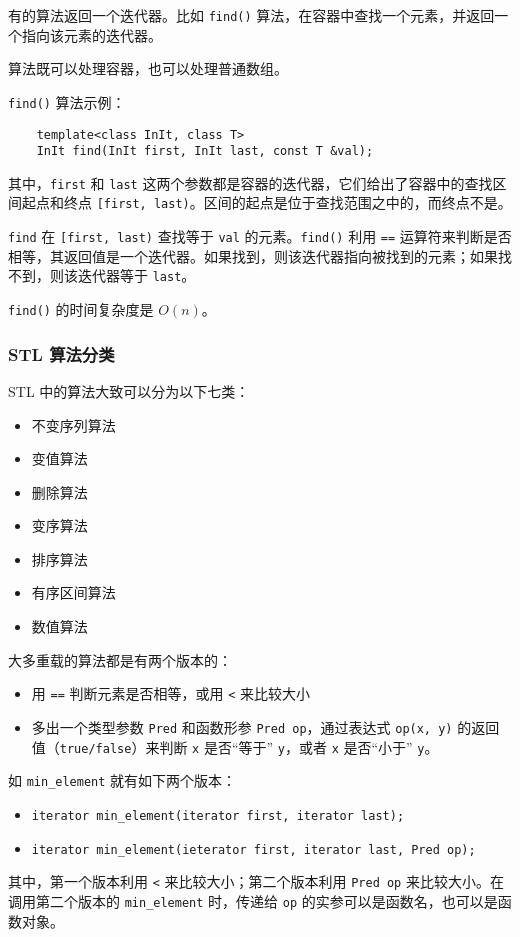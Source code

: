 \documentclass[UTF8]{ctexart}
\begin{document}
有的算法返回一个迭代器。比如 \texttt{find()} 算法，在容器中查找一个元素，并返回一个指向该元素的迭代器。

算法既可以处理容器，也可以处理普通数组。

\texttt{find()} 算法示例：
\begin{verbatim}
    template<class InIt, class T>
    InIt find(InIt first, InIt last, const T &val);
\end{verbatim}
其中，\texttt{first} 和 \texttt{last} 这两个参数都是容器的迭代器，它们给出了容器中的查找区间起点和终点
\texttt{[first, last)}。区间的起点是位于查找范围之中的，而终点不是。

\texttt{find} 在 \texttt{[first, last)} 查找等于 \texttt{val} 的元素。\texttt{find()} 利用 \texttt{==}
运算符来判断是否相等，其返回值是一个迭代器。如果找到，则该迭代器指向被找到的元素；如果找不到，则该迭代器等于
\texttt{last}。

\texttt{find()} 的时间复杂度是 $O(n)$。

\subsubsection{STL 算法分类}
STL 中的算法大致可以分为以下七类：
\begin{itemize}
    \item 不变序列算法
    \item 变值算法
    \item 删除算法
    \item 变序算法
    \item 排序算法
    \item 有序区间算法
    \item 数值算法
\end{itemize}

大多重载的算法都是有两个版本的：
\begin{itemize}
    \item 用 \texttt{==} 判断元素是否相等，或用 \texttt{<} 来比较大小
    \item 多出一个类型参数 \texttt{Pred} 和函数形参 \texttt{Pred op}，通过表达式 \texttt{op(x, y)} 的返回
    值（\texttt{true/false}）来判断 \texttt{x} 是否“等于” \texttt{y}，或者 \texttt{x} 是否“小于”
    \texttt{y}。
\end{itemize}

如 \texttt{min\_element} 就有如下两个版本：
\begin{itemize}
    \item \texttt{iterator min_element(iterator first, iterator last);}
    \item \texttt{iterator min_element(ieterator first, iterator last, Pred op);}
\end{itemize}
其中，第一个版本利用 \texttt{<} 来比较大小；第二个版本利用 \texttt{Pred op} 来比较大小。在调用第二个版本的
\texttt{min\_element} 时，传递给 \texttt{op} 的实参可以是函数名，也可以是函数对象。
\end{document}
